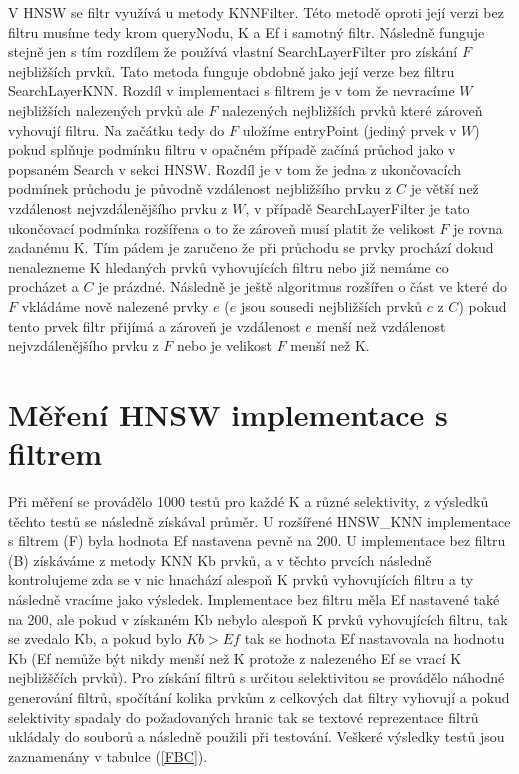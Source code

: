 \documentclass[czech,semestral,dept460,male,csharp,cpdeclaration]{diploma}
\begin{document}
		V HNSW se filtr využívá u metody KNNFilter. Této metodě oproti její verzi bez filtru musíme tedy krom queryNodu, K a Ef i samotný filtr. Následně funguje stejně jen s tím rozdílem že používá vlastní SearchLayerFilter pro získání $F$ nejbližších prvků. Tato metoda funguje obdobně jako její verze bez filtru SearchLayerKNN. Rozdíl v implementaci s filtrem je v tom že nevracíme $W$ nejbližších nalezených prvků ale $F$ nalezených nejbližších prvků které zároveň vyhovují filtru. Na začátku tedy do $F$ uložíme entryPoint (jediný prvek v $W$) pokud splňuje podmínku filtru v opačném případě začíná průchod jako v popsaném Search v sekci HNSW. Rozdíl je v tom že jedna z ukončovacích podmínek průchodu je původně vzdálenost nejbližšího prvku z $C$ je větší než vzdálenost nejvzdálenějšího prvku z $W$, v případě SearchLayerFilter je tato ukončovací podmínka rozšířena o to že zároveň musí platit že velikost $F$ je rovna zadanému K. Tím pádem je zaručeno že při průchodu se prvky prochází dokud nenalezneme K hledaných prvků vyhovujících filtru nebo již nemáme co procházet a $C$ je prázdné. Následně je ještě algoritmus rozšířen o část ve které do $F$ vkládáme nově nalezené prvky $e$ ($e$ jsou sousedi nejbližších prvků $c$ z $C$) pokud tento prvek filtr přijímá a zároveň je vzdálenost $e$ menší než vzdálenost nejvzdálenějšího prvku z $F$ nebo je velikost $F$ menší než K.
		
		\section{Měření HNSW implementace s filtrem}
		
		Při měření se provádělo 1000 testů pro každé K a různé selektivity, z výsledků těchto testů se následně získával průměr. U rozšířené HNSW\_KNN implementace s filtrem (F) byla hodnota Ef nastavena pevně na 200. U implementace bez filtru (B) získáváme z metody KNN Kb prvků, a v těchto prvcích následně kontrolujeme zda se v nic hnachází alespoň K prvků vyhovujících filtru a ty následně vracíme jako výsledek. Implementace bez filtru měla Ef nastavené také na 200, ale pokud v získaném Kb nebylo alespoň K prvků vyhovujících filtru, tak se zvedalo Kb, a pokud bylo $Kb > Ef$ tak se hodnota Ef nastavovala na hodnotu Kb (Ef nemůže být nikdy menší než K protože z nalezeného Ef se vrací K nejbližščích prvků). Pro získání filtrů s určitou selektivitou se provádělo náhodné generování filtrů, spočítání kolika prvkům z celkových dat filtry vyhovují a pokud selektivity spadaly do požadovaných hranic tak se textové reprezentace filtrů ukládaly do souborů a následně použili při testování. Veškeré výsledky testů jsou zaznamenány v tabulce (\ref{FBC}).
		
\end{document}
